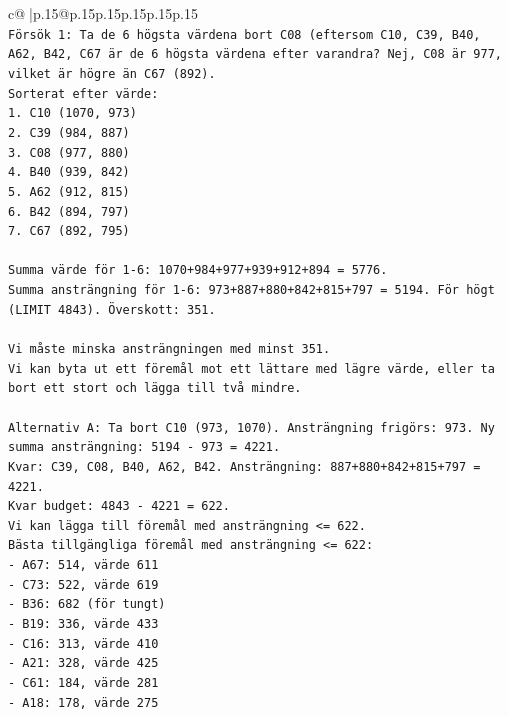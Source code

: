 \documentclass{article}
\begin{document}
{\begin{supertabular}{c@{$\;$}|p{.15\linewidth}@{}p{.15\linewidth}p{.15\linewidth}p{.15\linewidth}p{.15\linewidth}p{.15\linewidth}}
{{{\\ 
\texttt{Försök 1: Ta de 6 högsta värdena bort C08 (eftersom C10, C39, B40, A62, B42, C67 är de 6 högsta värdena efter varandra? Nej, C08 är 977, vilket är högre än C67 (892).} \\
\texttt{Sorterat efter värde:} \\
\texttt{1. C10 (1070, 973)} \\
\texttt{2. C39 (984, 887)} \\
\texttt{3. C08 (977, 880)} \\
\texttt{4. B40 (939, 842)} \\
\texttt{5. A62 (912, 815)} \\
\texttt{6. B42 (894, 797)} \\
\texttt{7. C67 (892, 795)} \\
\\ 
\texttt{Summa värde för 1{-}6: 1070+984+977+939+912+894 = 5776.} \\
\texttt{Summa ansträngning för 1{-}6: 973+887+880+842+815+797 = 5194. För högt (LIMIT 4843). Överskott: 351.} \\
\\ 
\texttt{Vi måste minska ansträngningen med minst 351.} \\
\texttt{Vi kan byta ut ett föremål mot ett lättare med lägre värde, eller ta bort ett stort och lägga till två mindre.} \\
\\ 
\texttt{Alternativ A: Ta bort C10 (973, 1070). Ansträngning frigörs: 973. Ny summa ansträngning: 5194 {-} 973 = 4221.} \\
\texttt{Kvar: C39, C08, B40, A62, B42. Ansträngning: 887+880+842+815+797 = 4221.} \\
\texttt{Kvar budget: 4843 {-} 4221 = 622.} \\
\texttt{Vi kan lägga till föremål med ansträngning <= 622.} \\
\texttt{Bästa tillgängliga föremål med ansträngning <= 622:} \\
\texttt{{-} A67: 514, värde 611} \\
\texttt{{-} C73: 522, värde 619} \\
\texttt{{-} B36: 682 (för tungt)} \\
\texttt{{-} B19: 336, värde 433} \\
\texttt{{-} C16: 313, värde 410} \\
\texttt{{-} A21: 328, värde 425} \\
\texttt{{-} C61: 184, värde 281} \\
\texttt{{-} A18: 178, värde 275} \\
}}}
\end{supertabular}}
\end{document}
